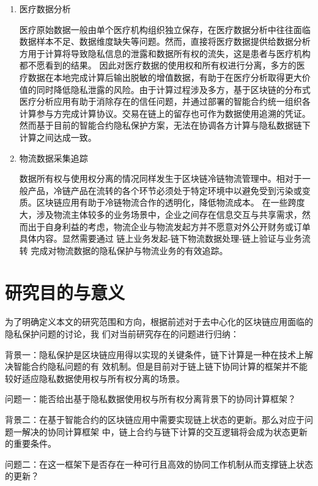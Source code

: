 \begin{enumerate}

\item 医疗数据分析

医疗原始数据一般由单个医疗机构组织独立保存，在医疗数据分析中往往面临数据样本不足、数据维度缺失等问题。然而，直接将医疗数据提供给数据分析方用于计算将导致隐私信息的泄露和数据所有权的流失，这是患者与医疗机构都不愿看到的结果。
因此对医疗数据的使用权和所有权进行分离，多方的医疗数据在本地完成计算后输出脱敏的增值数据，有助于在医疗分析取得更大价值的同时降低隐私泄露的风险。由于计算过程涉及多方，基于区块链的分布式医疗分析应用有助于消除存在的信任问题，并通过部署的智能合约统一组织各计算参与方完成计算协议。交易在链上的留存也可作为数据使用追溯的凭证。然而基于目前的智能合约隐私保护方案，无法在协调各方计算与隐私数据链下计算之间达成一致。
    
\item 物流数据采集追踪

数据所有权与使用权分离的情况同样发生于区块链冷链物流管理中。相对于一般产品，冷链产品在流转的各个环节必须处于特定环境中以避免受到污染或变质。区块链应用有助于冷链物流合作的透明化，降低物流成本。
在一些跨度大，涉及物流主体较多的业务场景中，企业之间存在信息交互与共享需求，然而出于自身利益的考虑，物流企业与物流发起方并不愿意对外公开财务或订单具体内容。显然需要通过 链上业务发起-链下物流数据处理-链上验证与业务流转 完成对物流数据的隐私保护与物流业务的有效追踪。

\end{enumerate}

\section{研究目的与意义}

为了明确定义本文的研究范围和方向，根据前述对于去中心化的区块链应用面临的隐私保护问题的讨论，我
们对当前研究存在的问题进行归纳：

背景一：隐私保护是区块链应用得以实现的关键条件，链下计算是一种在技术上解决智能合约隐私问题的有
效机制。但是目前对于链上链下协同计算的框架并不能较好适应隐私数据使用权与所有权分离的场景。

问题一：能否给出基于隐私数据使用权与所有权分离背景下的协同计算框架？

背景二：在基于智能合约的区块链应用中需要实现链上状态的更新。那么对应于问题一解决的协同计算框架
中，链上合约与链下计算的交互逻辑将会成为状态更新的重要条件。

问题二：在这一框架下是否存在一种可行且高效的协同工作机制从而支撑链上状态的更新？

